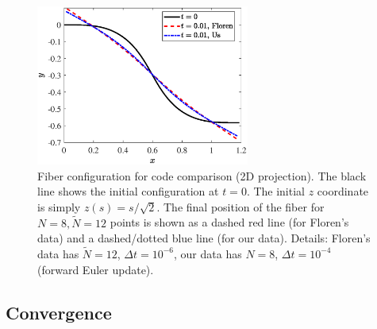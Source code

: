 \documentclass{article}
\begin{document}
\begin{figure}
\centering 
\includegraphics[width=70mm]{FiberInitial.eps}
\caption{Fiber configuration for code comparison (2D projection). The black line shows the initial configuration at $t=0$. The initial $z$ coordinate is simply $z(s)=s/\sqrt{2}$. The final position of the fiber for $N=8, \tilde{N}=12$ points is shown as a dashed red line (for Floren's data) and a dashed/dotted blue line (for our data). Details: Floren's data has $\tilde{N}=12$, $\Delta t =10^{-6}$, our data has $N=8$, $\Delta t=10^{-4}$ (forward Euler update).}
\label{fig:3Dfibt0}
\end{figure}

\subsection{Convergence}
\label{sec:conv}
\end{document}

